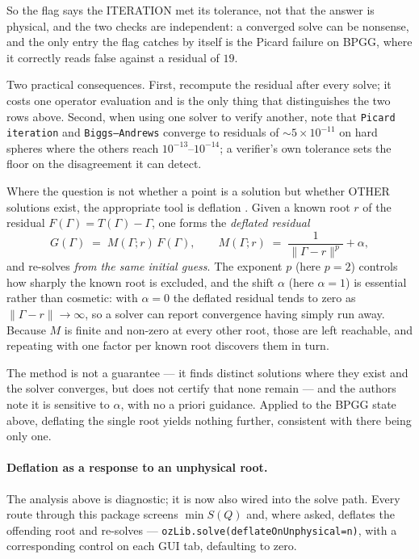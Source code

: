 \documentclass[11pt,a4paper]{article}
\newcommand{\code}[1]{\texttt{\hspace{0pt}#1}}
\begin{document}
So the flag says the ITERATION met its tolerance, not that the answer is
physical, and the two checks are independent: a converged solve can be
nonsense, and the only entry the flag catches by itself is the Picard failure
on BPGG, where it correctly reads false against a residual of $19$.

Two practical consequences. First, recompute the residual after every solve;
it costs one operator evaluation and is the only thing that distinguishes the
two rows above. Second, when using one solver to verify another, note that
\code{Picard iteration} and \code{Biggs--Andrews} converge to residuals of
$\sim 5\times10^{-11}$ on hard spheres where the others reach
$10^{-13}$--$10^{-14}$; a verifier's own tolerance sets the floor on the
disagreement it can detect.

Where the question is not whether a point is a solution but whether OTHER
solutions exist, the appropriate tool is deflation
\citep{FarrellBirkissonFunke2015}. Given a known root $r$ of the residual
$F(\Gamma) = T(\Gamma) - \Gamma$, one forms the \emph{deflated residual}
\begin{equation}
 G(\Gamma) \;=\; M(\Gamma; r)\, F(\Gamma),
 \qquad
 M(\Gamma; r) \;=\; \frac{1}{\|\Gamma - r\|^{p}} + \alpha ,
 \label{eq:deflation}
\end{equation}
and re-solves \emph{from the same initial guess}. The exponent $p$ (here
$p = 2$) controls how sharply the known root is excluded, and the shift
$\alpha$ (here $\alpha = 1$) is essential rather than cosmetic: with
$\alpha = 0$ the deflated residual tends to zero as
$\|\Gamma - r\| \to \infty$, so a solver can report convergence having simply
run away. Because $M$ is finite and non-zero at every other root, those are
left reachable, and repeating with one factor per known root discovers them
in turn.

The method is not a guarantee --- it finds distinct solutions where they
exist and the solver converges, but does not certify that none remain --- and
the authors note it is sensitive to $\alpha$, with no a priori guidance.
Applied to the BPGG state above, deflating the single root yields nothing
further, consistent with there being only one.

\paragraph{Deflation as a response to an unphysical root.} The analysis above
is diagnostic; it is now also wired into the solve path. Every route through
this package screens $\min S(Q)$ and, where asked, deflates the offending
root and re-solves --- \code{ozLib.solve(deflateOnUnphysical=n)}, with a
corresponding control on each GUI tab, defaulting to zero.
\end{document}

